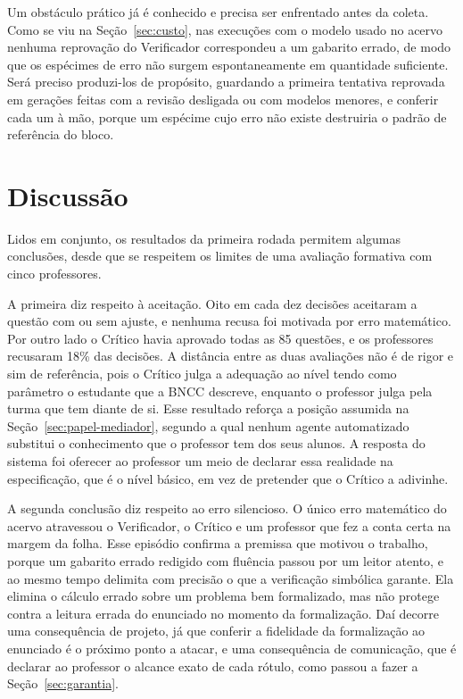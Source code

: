 Um obstáculo prático já é conhecido e precisa ser enfrentado antes da coleta. Como se viu na
Seção~\ref{sec:custo}, nas execuções com o modelo usado no acervo nenhuma reprovação do Verificador
correspondeu a um gabarito errado, de modo que os espécimes de erro não surgem espontaneamente em
quantidade suficiente. Será preciso produzi-los de propósito, guardando a primeira tentativa
reprovada em gerações feitas com a revisão desligada ou com modelos menores, e conferir cada um à mão,
porque um espécime cujo erro não existe destruiria o padrão de referência do bloco.

\section{Discussão}
\label{sec:discussao-avaliacao}

Lidos em conjunto, os resultados da primeira rodada permitem algumas conclusões, desde que se
respeitem os limites de uma avaliação formativa com cinco professores.

A primeira diz respeito à aceitação. Oito em cada dez decisões aceitaram a questão com ou sem
ajuste, e nenhuma recusa foi motivada por erro matemático. Por outro lado o Crítico havia aprovado
todas as 85 questões, e os professores recusaram 18\% das decisões. A distância entre as duas
avaliações não é de rigor e sim de referência, pois o Crítico julga a adequação ao nível tendo como
parâmetro o estudante que a BNCC descreve, enquanto o professor julga pela turma que tem diante de si.
Esse resultado reforça a posição assumida na Seção~\ref{sec:papel-mediador}, segundo a qual nenhum
agente automatizado substitui o conhecimento que o professor tem dos seus alunos. A resposta do
sistema foi oferecer ao professor um meio de declarar essa realidade na especificação, que é o nível
básico, em vez de pretender que o Crítico a adivinhe.

A segunda conclusão diz respeito ao erro silencioso. O único erro matemático do acervo atravessou
o Verificador, o Crítico e um professor que fez a conta certa na margem da folha. Esse episódio
confirma a premissa que motivou o trabalho, porque um gabarito errado redigido com fluência passou
por um leitor atento, e ao mesmo tempo delimita com precisão o que a verificação simbólica garante.
Ela elimina o cálculo errado sobre um problema bem formalizado, mas não protege contra a leitura
errada do enunciado no momento da formalização. Daí decorre uma consequência de projeto, já que
conferir a fidelidade da formalização ao enunciado é o próximo ponto a atacar, e uma consequência de
comunicação, que é declarar ao professor o alcance exato de cada rótulo, como passou a fazer a
Seção~\ref{sec:garantia}.

